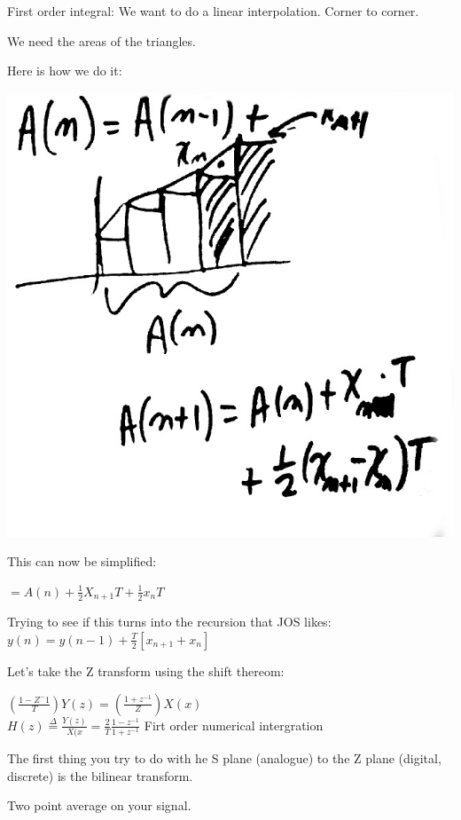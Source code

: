 First order integral: We want to do a linear interpolation.
Corner to corner. 

We need the areas of the triangles. 

Here is how we do it:

\includegraphics[scale=0.25]{photos/jan17/9i}

This can now be simplified:

$=A(n) + \frac{1}{2}X_{n + 1}T + \frac{1}{2}x_nT$

Trying to see if this turns into the recursion that JOS likes:
$y(n) = y(n -1) + \frac{T}{2}[x_{n + 1} + x_n]$



Let's take the Z transform using the shift thereom:

$(\frac{1 - Z^ -1}{T})Y(z) = (\frac{1 + z^{-1}}{Z})X(x)$ \\

$H(z) \stackrel{\Delta}{=} \frac{Y(z)}{X(x} = 
\frac{2}{T} \frac{1 - z^{-1}}{1 + z^{-1}}$
Firt order numerical intergration

The first thing you try to do with he S plane (analogue) to the Z plane (digital, discrete) is the bilinear transform. 

Two point average on your signal. 

